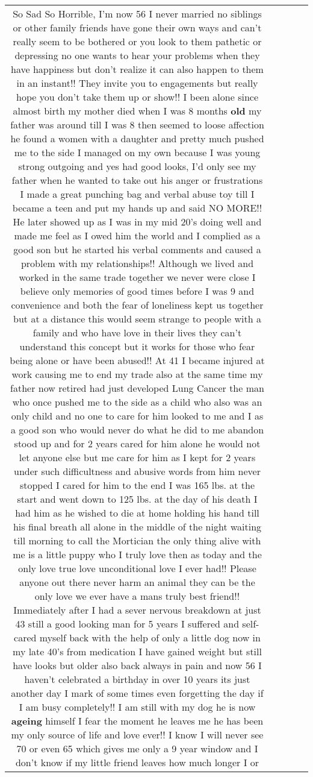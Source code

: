 \documentclass[11pt]{article}
\newlength\mylength
\begin{document}
\begin{center}
\begin{longtable}{|C{.65\mylength}|C{.30\mylength}|C{.12\mylength}|C{.12\mylength}|C{.12\mylength}|}
  \small So Sad So Horrible, I'm now 56 I never married no siblings or other family friends have gone their own ways and can't really seem to be bothered or you look to them pathetic or depressing no one wants to hear your problems when they have happiness but don't realize it can also happen to them in an instant!! They invite you to engagements but really hope you don't take them up or show!! I been alone since almost birth my mother died when I was 8 months \textbf{old} my father was around till I was 8 then seemed to loose affection he found a women with a daughter and pretty much pushed me to the side I managed on my own because I was young strong outgoing and yes had good looks, I'd only see my father when he wanted to take out his anger or frustrations I made a great punching bag and verbal abuse toy till I became a teen and put my hands up and said NO MORE!! He later showed up as I was in my mid 20's doing well and made me feel as I owed him the world and I complied as a good son but he started his verbal comments and caused a problem with my relationships!! Although we lived and worked in the same trade together we never were close I believe only memories of good times before I was 9 and convenience and both the fear of loneliness kept us together but at a distance this would seem strange to people with a family and who have love in their lives they can't understand this concept but it works for those who fear being alone or have been abused!! At 41 I became injured at work causing me to end my trade also at the same time my father now retired had just developed Lung Cancer the man who once pushed me to the side as a child who also was an only child and no one to care for him looked to me and I as a good son who would never do what he did to me abandon stood up and for 2 years cared for him alone he would not let anyone else but me care for him as I kept for 2 years under such difficultness and abusive words from him never stopped I cared for him to the end I was 165 lbs. at the start and went down to 125 lbs. at the day of his death I had him as he wished to die at home holding his hand till his final breath all alone in the middle of the night waiting till morning to call the Mortician the only thing alive with me is a little puppy who I truly love then as today and the only love true love unconditional love I ever had!! Please anyone out there never harm an animal they can be the only love we ever have a mans truly best friend!! Immediately after I had a sever nervous breakdown at just 43 still a good looking man for 5 years I suffered and self-cared myself back with the help of only a little dog now in my late 40's from medication I have gained weight but still have looks but older also back always in pain and now 56 I haven't celebrated a birthday in over 10 years its just another day I mark of some times even forgetting the day if I am busy completely!! I am still with my dog he is now \textbf{ageing} himself I fear the moment he leaves me he has been my only source of life and love ever!! I know I will never see 70 or even 65 which gives me only a 9 year window and I don't know if my little friend leaves how much longer I or 
\end{longtable}
\end{center}
\end{document}

